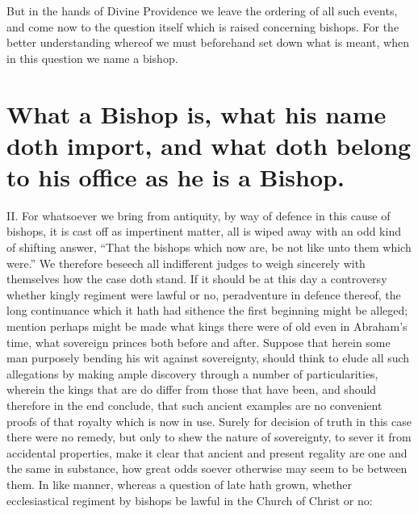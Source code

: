 But in the hands of Divine Providence we leave the ordering of all such events, and come now to the question itself which is raised concerning bishops. For the better understanding whereof we must beforehand set down what is meant, when in this question we name a bishop.

\section*{What a Bishop is, what his name doth import, and what doth belong to his office as he is a Bishop.}

II. For whatsoever we bring from antiquity, by way of defence in this cause of bishops, it is cast off as impertinent matter, all is wiped away with an odd kind of shifting answer, “That the bishops which now are, be not like unto them which were.” We therefore beseech all indifferent judges to weigh sincerely with themselves how the case doth stand. If it should be at this day a controversy whether kingly regiment were lawful or no, peradventure in defence thereof, the long continuance which it hath had sithence the first beginning might be alleged; mention perhaps might be made what kings there were of old even in Abraham’s time, what sovereign princes both before and after. Suppose that herein some man purposely bending his wit against sovereignty, should think to elude all such allegations by making ample discovery through a number of particularities, wherein the kings that are do differ from those that have been, and should therefore in the end conclude, that such ancient examples are no convenient proofs of that royalty which is now in use. Surely for decision of truth in this case there were no remedy, but only to shew the nature of sovereignty, to sever it from accidental properties, make it clear that ancient and present regality are one and the same in substance, how great odds soever otherwise may seem to be between them. In like manner, whereas a question of late hath grown, whether ecclesiastical regiment by bishops be lawful in the Church of  Christ or no:
